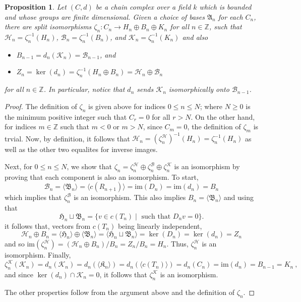 \documentclass[10pt,a4paper]{amsart}
\newtheorem{proposition}{Proposition}
\newcommand{\B}{\mathcal{B}}
\newcommand{\Z}{\mathbb{Z}}
\newcommand{\cH}{\mathcal{H}}
\newcommand{\cK}{\mathcal{K}}
\newcommand{\fA}{\mathfrak{A}}
\newcommand{\fB}{\mathfrak{B}}
\newcommand{\fH}{\mathfrak{H}}
\newcommand{\fK}{\mathfrak{K}}
\newcommand{\ima}{\mathrm{im}}
\begin{document}
\begin{proposition}\label{prop:splittings-finite-dimensional}
    Let $(C,d)$ be a chain complex over a field $k$ which is bounded and whose groups are finite dimensional.
    Given a choice of bases $\fA_n$ for each $C_n$, there are split isomorphisms $\zeta_n\colon C_n\rightarrow H_n\oplus B_n\oplus K_n$ 
    for all $n\in \Z$, such that $\cH_n = \zeta_{n}^{-1}(H_n)$, $\B_n = \zeta_n^{-1}(B_n)$, and $\cK_n = \zeta_{n}^{-1}(K_n)$ and also 
\begin{itemize}
    \item $B_{n-1} = d_n(\cK_{n}) = \B_{n-1}$, and 
    \item $Z_n = \ker(d_n) =  \zeta^{-1}_n(H_n \oplus B_n) = \cH_n \oplus \B_n$
\end{itemize}
for all $n\in \Z$. 
In particular, notice that $d_n$ sends $\cK_n$ isomorphically onto $\B_{n-1}$.
\end{proposition}

\begin{proof}
The definition of $\zeta_n$ is given above for indices $0\leq n \leq N$; where $N\geq 0$ is the minimum positive integer such that $C_r=0$ for all $r>N$.
On the other hand, for indices $m \in \Z$ such that $m < 0$ or $m>N$, since $C_m=0$, the definition of $\zeta_m$ is trvial.
Now, by definition, it follows that $\cH_n=(\zeta^\cH_n)^{-1}(H_n)=\zeta_n^{-1}(H_n)$ as well as the other two equalites for inverse images. 

Next, for $0\leq n \leq N$, we show that  $\zeta_n=\zeta^\cH_n\oplus \zeta^\B_n\oplus \zeta^\cK_n$ is an isomorphism by proving that each component is also an isomorphism.
To start,  
\[
\B_n = \langle \fB_n\rangle = \langle c(R_{n+1})\rangle = \ima (D_n) = \ima(d_n) = B_n
\]
which implies that $\zeta^\B_n$ is an isomorphism. 
This also implies $B_n = \langle \fB_n\rangle$ and using that 
\[
\fH_n \sqcup \fB_n =\{ v \in c(T_n) \mid \mbox{ such that } D_nv=0\}.
\]
it follows that, vectors from $c(T_n)$ being linearly independent,
\[
\cH_n \oplus B_n = \langle\fH_n\rangle \oplus \langle \fB_n\rangle = 
\langle\fH_n \sqcup \fB_n\rangle = 
\ker(D_n)=\ker(d_n)=Z_n
\]
and so
$
\ima(\zeta^\cH_n)= (\cH_n \oplus B_n)/B_n = Z_n/B_n=H_n
$.
Thus, $\zeta^\cH_n$ is an isomorphism.
Finally, 
\[
\zeta^\cK_n(\cK_n)=d_n(\cK_n) = d_n(\langle\fK_n \rangle) = d_n(\langle c(T_n)\rangle) = d_n(C_n) = \ima(d_n)=B_{n-1}=K_n\ ,
\]
and since $\ker(d_n)\cap \cK_n=0$, it follows that $\zeta^\cK_n$ is an isomorphism.

The other properties follow from the argument above and the definition of $\zeta_n$.
\end{proof}
\end{document}
